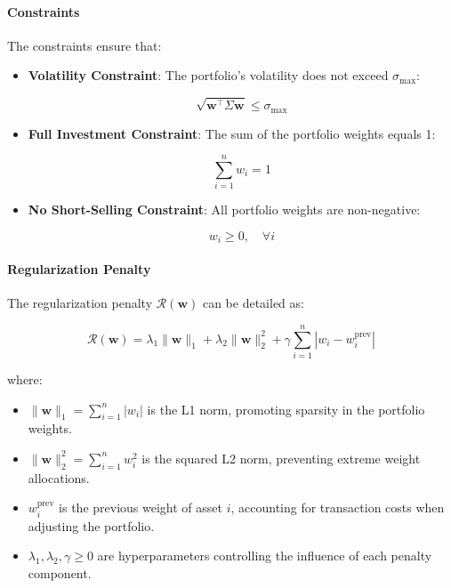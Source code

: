 \paragraph{Constraints}

The constraints ensure that:

\begin{itemize}
    \item \textbf{Volatility Constraint}: The portfolio's volatility does not exceed \( \sigma_{\text{max}} \):

    \[
    \sqrt{\mathbf{w}^\top \Sigma \mathbf{w}} \leq \sigma_{\text{max}}
    \]

    \item \textbf{Full Investment Constraint}: The sum of the portfolio weights equals 1:

    \[
    \sum_{i=1}^n w_i = 1
    \]

    \item \textbf{No Short-Selling Constraint}: All portfolio weights are non-negative:

    \[
    w_i \geq 0, \quad \forall i
    \]
\end{itemize}

\paragraph{Regularization Penalty}

The regularization penalty \( \mathcal{R}(\mathbf{w}) \) can be detailed as:

\[
\mathcal{R}(\mathbf{w}) = \lambda_1 \|\mathbf{w}\|_1 + \lambda_2 \|\mathbf{w}\|_2^2 + \gamma \sum_{i=1}^n |w_i - w_i^{\text{prev}}|
\]

where:

\begin{itemize}
    \item \( \|\mathbf{w}\|_1 = \sum_{i=1}^n |w_i| \) is the L1 norm, promoting sparsity in the portfolio weights.
    \item \( \|\mathbf{w}\|_2^2 = \sum_{i=1}^n w_i^2 \) is the squared L2 norm, preventing extreme weight allocations.
    \item \( w_i^{\text{prev}} \) is the previous weight of asset \( i \), accounting for transaction costs when adjusting the portfolio.
    \item \( \lambda_1, \lambda_2, \gamma \geq 0 \) are hyperparameters controlling the influence of each penalty component.
\end{itemize}

